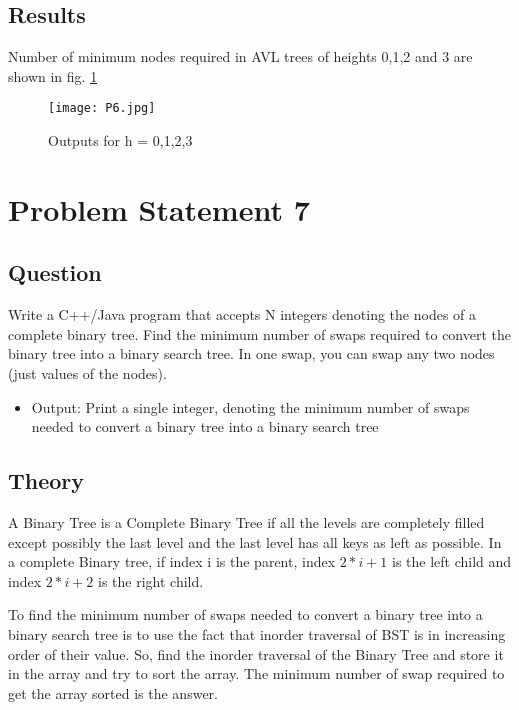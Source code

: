 \documentclass[11pt,a4paper]{article}
\begin{document}
\subsection{Results}\label{sec:results6}
Number of minimum nodes required in AVL trees of heights 0,1,2 and 3 are shown in fig. \ref{fig:output_6}
\begin{figure}[ht]
\texttt{[image: P6.jpg]}
\centering
\caption{Outputs for h = 0,1,2,3}
\label{fig:output_6}
\end{figure}

\clearpage

\section{Problem Statement 7}\label{sec:problem7}
\subsection{Question}\label{sec:question7}
Write a C++/Java program that accepts N integers denoting the nodes of a complete binary tree. Find the minimum number of swaps required to convert the binary tree into a binary search tree. In one swap, you can swap any two nodes (just values of the nodes).
\begin{itemize}
    \item Output: Print a single integer, denoting the minimum number of swaps needed to convert a binary tree into a binary search tree
\end{itemize}

\subsection{Theory}\label{sec:theory7}
A Binary Tree is a Complete Binary Tree if all the levels are completely filled except possibly the last level and the last level has all keys as left as possible. In a complete Binary tree, if index i is the parent, index $2*i + 1$ is the left child and index $2*i + 2$ is the right child.

To find the minimum number of swaps needed to convert a binary tree into a binary search tree is  to use the fact that inorder traversal of BST is in increasing order of their value. So, find the inorder traversal of the Binary Tree and store it in the array and try to sort the array. The minimum number of swap required to get the array sorted is the answer.
\end{document}
